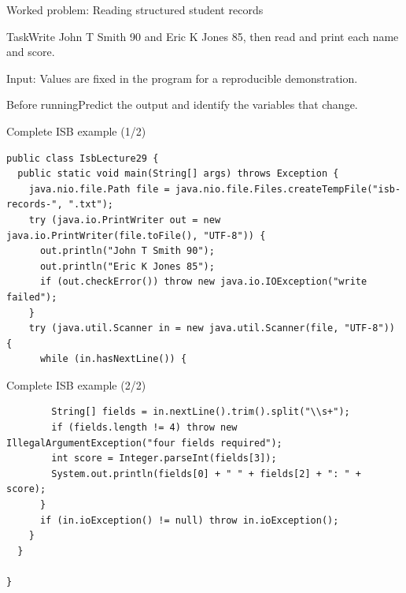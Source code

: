 \documentclass[10pt,aspectratio=169]{beamer}
\begin{document}
\begin{frame}[fragile,t]{Worked problem: Reading structured student records}
\begin{block}{Task}Write John T Smith 90 and Eric K Jones 85, then read and print each name and score.\end{block}
\small Input: Values are fixed in the program for a reproducible demonstration.\par\vspace{3mm}\begin{exampleblock}{Before running}Predict the output and identify the variables that change.\end{exampleblock}
\end{frame}

\begin{frame}[fragile,t]{Complete ISB example (1/2)}
\begin{lstlisting}
public class IsbLecture29 {
  public static void main(String[] args) throws Exception {
    java.nio.file.Path file = java.nio.file.Files.createTempFile("isb-records-", ".txt");
    try (java.io.PrintWriter out = new java.io.PrintWriter(file.toFile(), "UTF-8")) {
      out.println("John T Smith 90");
      out.println("Eric K Jones 85");
      if (out.checkError()) throw new java.io.IOException("write failed");
    }
    try (java.util.Scanner in = new java.util.Scanner(file, "UTF-8")) {
      while (in.hasNextLine()) {
\end{lstlisting}
\end{frame}

\begin{frame}[fragile,t]{Complete ISB example (2/2)}
\begin{lstlisting}
        String[] fields = in.nextLine().trim().split("\\s+");
        if (fields.length != 4) throw new IllegalArgumentException("four fields required");
        int score = Integer.parseInt(fields[3]);
        System.out.println(fields[0] + " " + fields[2] + ": " + score);
      }
      if (in.ioException() != null) throw in.ioException();
    }
  }

}
\end{lstlisting}
\end{frame}
\end{document}

